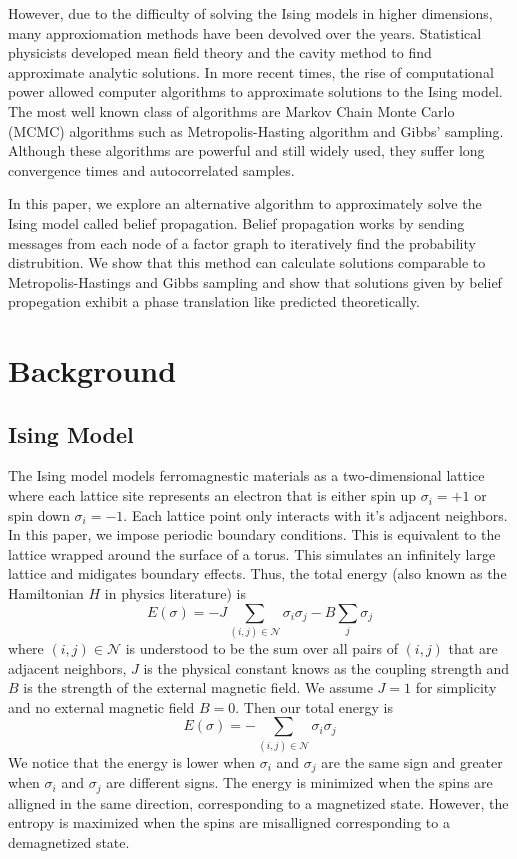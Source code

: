\documentclass{article}
\begin{document}
    However, due to the difficulty of solving the Ising models in higher dimensions, many approxiomation methods have been devolved over the years. 
    Statistical physicists developed mean field theory and the cavity method to find approximate analytic solutions. In more recent times, the rise of computational 
    power allowed computer algorithms to approximate solutions to the Ising model. The most well known class of algorithms are Markov Chain Monte Carlo (MCMC) algorithms such as 
    Metropolis-Hasting algorithm and Gibbs' sampling. Although these algorithms are powerful and still widely used, they suffer long convergence times and autocorrelated samples.
    
    In this paper, we explore an alternative algorithm to approximately solve the Ising model called belief propagation. Belief propagation works by sending messages 
    from each node of a factor graph to iteratively find the probability distrubition. We show that this method can calculate solutions comparable to Metropolis-Hastings and Gibbs sampling 
    and show that solutions given by belief propegation exhibit a phase translation like predicted theoretically. 


\section{Background}
\label{Mathematical Background}
    \subsection{Ising Model}
    The Ising model models ferromagnestic materials as a two-dimensional lattice where each lattice site represents an 
    electron that is either spin up $\sigma_i = +1$ or spin down $\sigma_i = -1$. Each lattice point only interacts
    with it's adjacent neighbors. In this paper, we impose periodic boundary conditions. This is equivalent to the lattice wrapped around the surface of a torus. This simulates 
    an infinitely large lattice and midigates boundary effects. Thus, the total energy (also known as the Hamiltonian $H$ in physics literature) is
\begin{equation}
    E(\sigma) = - J \sum_{(i,j) \in \mathcal{N}} \sigma_i \sigma_j - B \sum_{j} \sigma_j
\end{equation}
where $(i,j) \in \mathcal{N}$ is understood to be the sum over all pairs of $(i,j)$ that are adjacent neighbors,
$J$ is the physical constant knows as the coupling strength and $B$ is the strength of the external magnetic field.
We assume $J=1$ for simplicity and no external magnetic field $B=0$. Then our total energy is
\begin{equation}
    E(\sigma) = - \sum_{(i,j) \in \mathcal{N}} \sigma_i \sigma_j 
\end{equation} 
We notice that the energy is lower when $\sigma_i$ and $\sigma_j$ are the same sign and greater when $\sigma_i$ and $\sigma_j$ 
are different signs. The energy is minimized when the spins are alligned in the same direction, corresponding to a magnetized state.
However, the entropy is maximized when the spins are misalligned corresponding to a demagnetized state.
\end{document}
